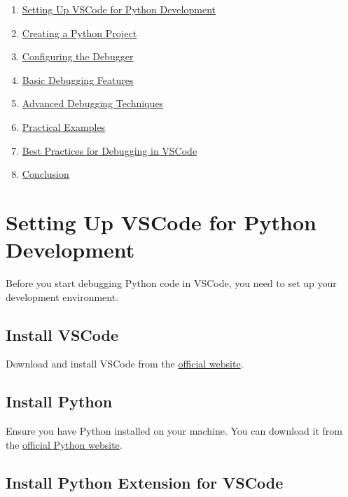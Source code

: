 \documentclass[
  letterpaper,
  DIV=11,
  numbers=noendperiod]{scrreprt}
\providecommand{\tightlist}{%
  \setlength{\itemsep}{0pt}\setlength{\parskip}{0pt}}\usepackage{longtable,booktabs,array}
\begin{document}
\begin{enumerate}
\def\labelenumi{\arabic{enumi}.}
\tightlist
\item
  \hyperref[setting-up-vscode-for-python-development]{Setting Up VSCode
  for Python Development}
\item
  \hyperref[creating-a-python-project]{Creating a Python Project}
\item
  \hyperref[configuring-the-debugger]{Configuring the Debugger}
\item
  \hyperref[basic-debugging-features]{Basic Debugging Features}
\item
  \hyperref[advanced-debugging-techniques]{Advanced Debugging
  Techniques}
\item
  \hyperref[practical-examples]{Practical Examples}
\item
  \hyperref[best-practices-for-debugging-in-vscode]{Best Practices for
  Debugging in VSCode}
\item
  \hyperref[conclusion]{Conclusion}
\end{enumerate}

\section{Setting Up VSCode for Python
Development}\label{setting-up-vscode-for-python-development}

Before you start debugging Python code in VSCode, you need to set up
your development environment.

\subsection{Install VSCode}\label{install-vscode}

Download and install VSCode from the
\href{https://code.visualstudio.com/}{official website}.

\subsection{Install Python}\label{install-python}

Ensure you have Python installed on your machine. You can download it
from the \href{https://www.python.org/}{official Python website}.

\subsection{Install Python Extension for
VSCode}\label{install-python-extension-for-vscode}
\end{document}
